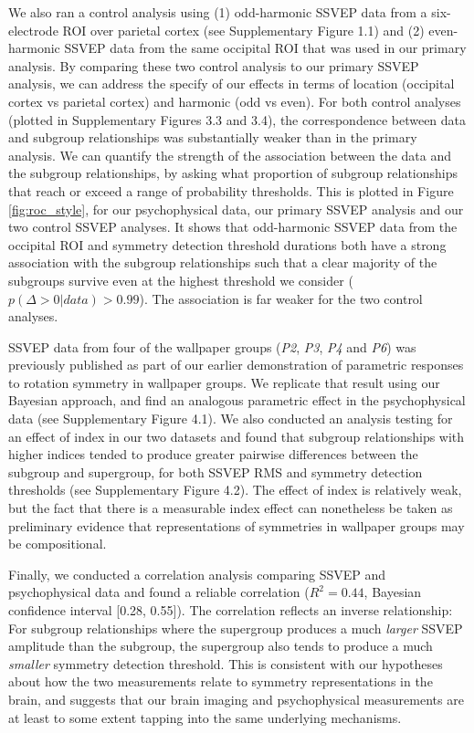 \documentclass[11pt, twoside]{article}
\begin{document}
We also ran a control analysis using (1) odd-harmonic SSVEP data from a six-electrode ROI over parietal cortex (see Supplementary Figure 1.1) and (2) even-harmonic SSVEP data from the same occipital ROI that was used in our primary analysis. By comparing these two control analysis to our primary SSVEP analysis, we can address the specify of our effects in terms of location (occipital cortex vs parietal cortex) and harmonic (odd vs even). For both control analyses (plotted in Supplementary Figures 3.3 and 3.4), the correspondence between data and subgroup relationships was substantially weaker than in the primary analysis. We can quantify the strength of the association between the data and the subgroup relationships, by asking what proportion of subgroup relationships that reach or exceed a range of probability thresholds. This is plotted in Figure \ref{fig:roc_style}, for our psychophysical data, our primary SSVEP analysis and our two control SSVEP analyses. It shows that odd-harmonic SSVEP data from the occipital ROI and symmetry detection threshold durations both have a strong association with the subgroup relationships such that a clear majority of the subgroups survive even at the highest threshold we consider ($p(\Delta>0|data)>0.99$). The association is far weaker for the two control analyses.

SSVEP data from four of the wallpaper groups (\textit{P2}, \textit{P3}, \textit{P4} and \textit{P6}) was previously published as part of our earlier demonstration of parametric responses to rotation symmetry in wallpaper groups\citep{RN1725}. We replicate that result using our Bayesian approach, and find an analogous parametric effect in the psychophysical data (see Supplementary Figure 4.1). We also conducted an analysis testing for an effect of index in our two datasets and found that subgroup relationships with higher indices tended to produce greater pairwise differences between the subgroup and supergroup, for both SSVEP RMS and symmetry detection thresholds (see Supplementary Figure 4.2). The effect of index is relatively weak, but the fact that there is a measurable index effect can nonetheless be taken as preliminary evidence that representations of symmetries in wallpaper groups may be compositional.

Finally, we conducted a correlation analysis comparing SSVEP and psychophysical data and found a reliable correlation ($R^2 = 0.44$, Bayesian confidence interval [0.28, 0.55]). The correlation reflects an inverse relationship: For subgroup relationships where the supergroup produces a much \textit{larger} SSVEP amplitude than the subgroup, the supergroup also tends to produce a much \textit{smaller} symmetry detection threshold. This is consistent with our hypotheses about how the two measurements relate to symmetry representations in the brain, and suggests that our brain imaging and psychophysical measurements are at least to some extent tapping into the same underlying mechanisms.
\end{document}
